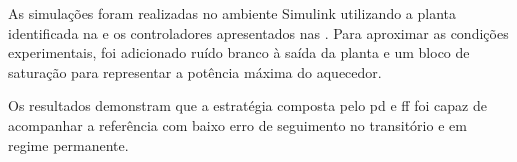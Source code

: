 As simulações foram realizadas no ambiente Simulink utilizando a planta
identificada na  e os controladores apresentados nas
. Para aproximar as condições
experimentais, foi adicionado ruído branco à saída da planta e um bloco de
saturação para representar a potência máxima do aquecedor.

Os resultados demonstram que a estratégia composta pelo \gls{pd} e \gls{ff} foi
capaz de acompanhar a referência com baixo erro de seguimento no transitório e
em regime permanente.